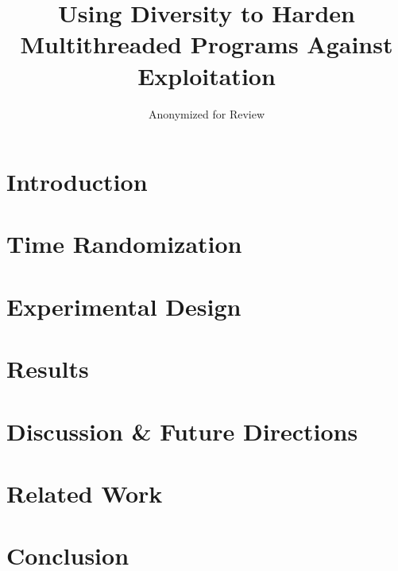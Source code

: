 \documentclass{llncs}
\begin{document}
%
\mainmatter              %
%
\title{Using Diversity to Harden Multithreaded Programs Against Exploitation}
%
\author{Anonymized for Review}
%

\maketitle              %

\begin{abstract}

\end{abstract}
%
\section{Introduction}


\section{Time Randomization}


\section{Experimental Design}


\section{Results}\label{results}


\section{Discussion \& Future Directions}


\section{Related Work}


\section{Conclusion}



%
%
{\footnotesize 
}
\end{document}
